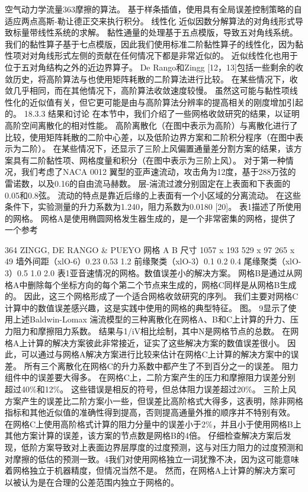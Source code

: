 \documentclass[UTF8,11pt,a4paper,openany,fontset=fandol]{ctexbook}
\begin{document}
空气动力学流量363摩擦的算法。 基于样条插值，使用具有全局误差控制策略的自适应两点高斯-勒让德正交来执行积分。 线性化 近似因数分解算法的对角线形式导致标量带线性系统的求解。 黏性通量的处理基于五点模版，导致五对角线系统。 我们的黏性算子基于七点模版，因此我们使用标准二阶黏性算子的线性化，因为黏性项对对角线形式左侧的贡献在任何情况下都是非常近似的。 近似线性化也用于位于五对角结构之外的近边界算子。 De Rango和Zingg [12，13]包括一些剩余的收敛历史，将高阶算法与也使用矩阵耗散的二阶算法进行比较。 在某些情况下，收敛几乎相同，而在其他情况下，高阶算法收敛速度较慢。 虽然这可能与黏性项线性化的近似值有关，但它更可能是由与高阶算法分辨率的提高相关的刚度增加引起的。 18.3.3 结果和讨论 在本节中，我们介绍了一些网格收敛研究的结果，以证明高阶空间离散化的相对性能。 高阶离散化（在图中表示为高阶）与离散化进行了比较，使用矩阵耗散的二阶中心差，以及低阶边界方案和二阶积分程序（在图中表示为二阶）。 在某些情况下，还显示了三阶上风偏置通量差分割方案的结果，该方案具有二阶黏性项、网格度量和积分（在图中表示为三阶上风）。 对于第一种情况，我们考虑了NACA 0012 翼型的亚声速流动，攻击角为12度，基于288万弦的雷诺数，以及0.16的自由流马赫数。 层-湍流过渡分别固定在上表面和下表面的0.05和0.8弦。 流动的特点是靠近后缘的上表面有一个小区域的分离流动。 在这些条件下，实验测量的升力系数为1.240，阻力系数为0.0180 [20]。 表1描述了所使用的网格。 网格A是使用椭圆网格发生器生成的，是一个非常密集的网格，提供了一个参考

364 ZINGG, DE RANGO \& PUEYO 网格 A B 尺寸 1057 x 193 529 x 97 265 x 49 墙外间距（xlO-6）0.23 0.53 1.2 前缘聚类（xlO-3）0.1 0.2 0.4 尾缘聚类（xlO-3）0.5 1.0 2.0 表1亚音速情况的网格。数值误差小的解决方案。 网格B是通过从网格A中删除每个坐标方向的每个第二个节点来生成的，网格C同样是从网格B生成的。 因此，这三个网格形成了一个适合网格收敛研究的序列。 我们主要对网格C计算中的数值误差感兴趣，这是实践中使用的网格的典型特征。 图。 9显示了使用上述Baldwin-Lomax 湍流模型的三种离散化在网格A、B和C上计算的升力、压力阻力和摩擦阻力系数。 结果与1/iV相比绘制，其中N是网格节点的总数。 在网格A上计算的解决方案彼此非常接近，证实了这些解决方案的数值误差很小。 因此，可以通过与网格A解决方案进行比较来估计在网格C上计算的解决方案中的误差。 所有三个离散化在网格C的升力系数中都产生了不到百分之一的误差。 阻力组件中的误差要大得多。 在网格C上，二阶方案产生的压力和摩擦阻力误差分别超过40\%和12\%。 这些错误是相反的符号，但总体阻力误差超过20\%。 三阶上风方案产生的误差比二阶方案小一些，但误差比高阶格式大得多，这表明，除非网格指标和其他近似值的准确性得到提高，否则提高通量外推的顺序并不特别有效。 在网格C上使用高阶格式计算的阻力分量中的误差小于2\%，并且小于使用网格B上其他方案计算的误差，该方案的节点数是网格B的4倍。 仔细检查解决方案后发现，低阶方案导致对上表面边界层厚度的过度预测，这与对压力阻力的过度预测和对摩擦的低估的预测一致。4我们对使用网格独立一词犹豫不决，因为这可能意味着网格独立于机器精度，但情况当然不是。 然而，在网格A上计算的解决方案可以被认为是在合理的公差范围内独立于网格的。
\end{document}
